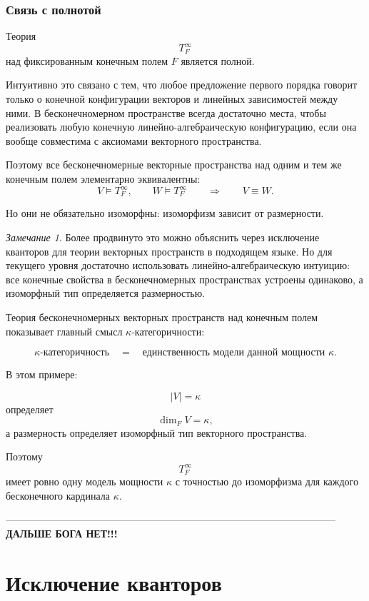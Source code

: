 \documentclass[12pt,a4paper,oneside,openany]{book}
\theoremstyle{definition}
\theoremstyle{plain}
\theoremstyle{remark}
\newtheorem{remark}{Замечание}[chapter]
\begin{document}
\subsubsection{Связь с полнотой}

Теория
\[
T_F^\infty
\]
над фиксированным конечным полем $F$ является полной.

Интуитивно это связано с тем, что любое предложение первого порядка говорит только о конечной конфигурации векторов и линейных зависимостей между ними. В бесконечномерном пространстве всегда достаточно места, чтобы реализовать любую конечную линейно-алгебраическую конфигурацию, если она вообще совместима с аксиомами векторного пространства.

Поэтому все бесконечномерные векторные пространства над одним и тем же конечным полем элементарно эквивалентны:
\[
V\models T_F^\infty,
\qquad
W\models T_F^\infty
\qquad
\Longrightarrow
\qquad
V\equiv W.
\]

Но они не обязательно изоморфны: изоморфизм зависит от размерности.

\begin{remark}
Более продвинуто это можно объяснить через исключение кванторов для теории векторных пространств в подходящем языке. Но для текущего уровня достаточно использовать линейно-алгебраическую интуицию: все конечные свойства в бесконечномерных пространствах устроены одинаково, а изоморфный тип определяется размерностью.
\end{remark}


Теория бесконечномерных векторных пространств над конечным полем показывает главный смысл $\kappa$-категоричности:

\[
\kappa\text{-категоричность}
\quad
=
\quad
\text{единственность модели данной мощности }\kappa.
\]

В этом примере:

\[
|V|=\kappa
\]
определяет
\[
\dim_F V=\kappa,
\]
а размерность определяет изоморфный тип векторного пространства.

Поэтому
\[
T_F^\infty
\]
имеет ровно одну модель мощности $\kappa$ с точностью до изоморфизма для каждого бесконечного кардинала $\kappa$.


---------------------------------------------------------------------------------------------------\\
\textbf{ДАЛЬШЕ БОГА НЕТ!!!}


\section{Исключение кванторов}
\end{document}
